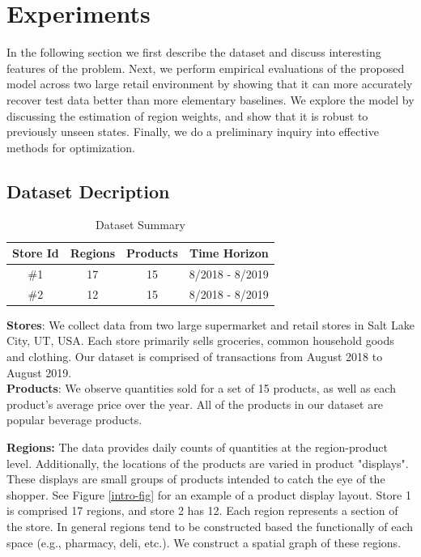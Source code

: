 \section{Experiments}\label{experiments}

In the following section we first describe the dataset and discuss interesting features of the problem. Next, we perform empirical evaluations of the proposed model across two large retail environment by showing that it can more accurately recover test data better than more elementary baselines.  We explore the model by discussing the estimation of region weights, and show that it is robust to previously unseen states. Finally, we do a preliminary inquiry into effective methods for  optimization.


\subsection{Dataset Decription}

\begin{table}[h]
    \centering
    \begin{tabular}{|c|c|c|c|}
         Store Id & Regions & Products & Time Horizon \\
         \hline
         \#1 & 17 & 15 & 8/2018 - 8/2019 \\
         \#2 & 12 & 15 & 8/2018 - 8/2019  \\
         \hline
    \end{tabular}
    \caption{Dataset Summary}
    \label{data}
\end{table}


\textbf{Stores}: We collect data from two large supermarket and retail stores in Salt Lake City, UT, USA. Each store primarily sells groceries, common household goods and clothing. Our dataset is comprised of transactions from August 2018 to August 2019.  \\
\textbf{Products}: We observe quantities sold for a set of 15 products, as well as each product's average price over the year. All of the products in our dataset are popular beverage products.

\textbf{Regions:} The data provides daily counts of quantities at the region-product level. Additionally, the locations of the products are varied in product "displays". These displays are small groups of products intended to catch the eye of the shopper. See Figure \ref{intro-fig} for an example of a product display layout. Store 1 is comprised 17 regions, and store 2 has 12. Each region represents a section of the store. In general regions tend to be constructed based the functionally of each space (e.g., pharmacy, deli, etc.). We construct a spatial graph of these regions.



